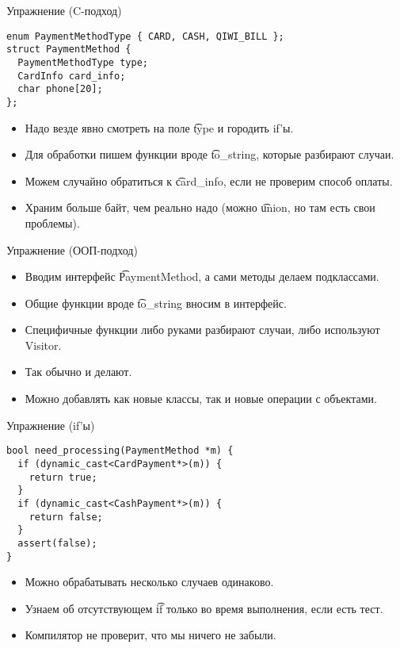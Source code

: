 \begin{frame}[fragile]{Упражнение (C-подход)}
\begin{verbatim}
enum PaymentMethodType { CARD, CASH, QIWI_BILL };
struct PaymentMethod {
  PaymentMethodType type;
  CardInfo card_info;
  char phone[20];
};
\end{verbatim}
	\begin{itemize}
		\item Надо везде явно смотреть на поле \t{type} и городить if'ы.
		\item Для обработки пишем функции вроде \t{to\_string}, которые разбирают случаи.
		\item Можем случайно обратиться к \t{card\_info}, если не проверим способ оплаты.
		\item Храним больше байт, чем реально надо (можно \t{union}, но там есть свои проблемы).
	\end{itemize}
\end{frame}

\begin{frame}{Упражнение (ООП-подход)}
	\begin{itemize}
		\item Вводим интерфейс \t{PaymentMethod}, а сами методы делаем подклассами.
		\item Общие функции вроде \t{to\_string} вносим в интерфейс.
		\item Специфичные функции либо руками разбирают случаи, либо используют Visitor.
		\item Так обычно и делают.
		\item Можно добавлять как новые классы, так и новые операции с объектами.
	\end{itemize}
\end{frame}

\begin{frame}[fragile]{Упражнение (if'ы)}
\begin{verbatim}
bool need_processing(PaymentMethod *m) {
  if (dynamic_cast<CardPayment*>(m)) {
    return true;
  }
  if (dynamic_cast<CashPayment*>(m)) {
    return false;
  }
  assert(false);
}
\end{verbatim}
	\begin{itemize}
		\item Можно обрабатывать несколько случаев одинаково.
		\item Узнаем об отсутствующем \t{if} только во время выполнения, если есть тест.
		\item Компилятор не проверит, что мы ничего не забыли.
	\end{itemize}
\end{frame}

